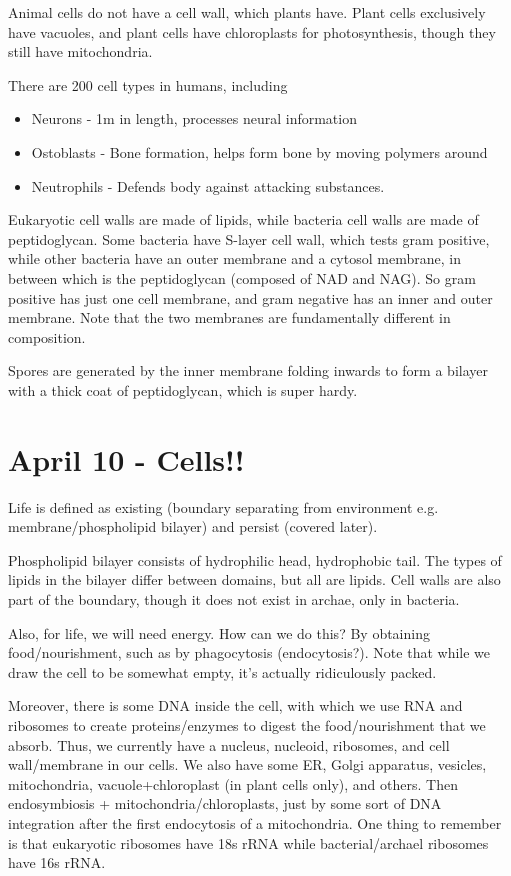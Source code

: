 \documentclass[12pt]{article}
\begin{document}
Animal cells do not have a cell wall, which plants have. Plant cells exclusively have vacuoles, and plant cells have chloroplasts for photosynthesis, though they still have mitochondria.

There are 200 cell types in humans, including

\begin{itemize}
	\item Neurons - 1m in length, processes neural information
	\item Ostoblasts - Bone formation, helps form bone by moving polymers around
	\item Neutrophils - Defends body against attacking substances.
\end{itemize}

Eukaryotic cell walls are made of lipids, while bacteria cell walls are made of peptidoglycan. Some bacteria have S-layer cell wall, which tests gram positive, while other bacteria have an outer membrane and a cytosol membrane, in between which is the peptidoglycan (composed of NAD and NAG). So gram positive has just one cell membrane, and gram negative has an inner and outer membrane. Note that the two membranes are fundamentally different in composition.

Spores are generated by the inner membrane folding inwards to form a bilayer with a thick coat of peptidoglycan, which is super hardy.

\section*{April 10 - Cells!!}

Life is defined as existing (boundary separating from environment e.g. membrane/phospholipid bilayer) and persist (covered later).

Phospholipid bilayer consists of hydrophilic head, hydrophobic tail. The types of lipids in the bilayer differ between domains, but all are lipids. Cell walls are also part of the boundary, though it does not exist in archae, only in bacteria.

Also, for life, we will need energy. How can we do this? By obtaining food/nourishment, such as by phagocytosis (endocytosis?). Note that while we draw the cell to be somewhat empty, it's actually ridiculously packed.

Moreover, there is some DNA inside the cell, with which we use RNA and ribosomes to create proteins/enzymes to digest the food/nourishment that we absorb. Thus, we currently have a nucleus, nucleoid, ribosomes, and cell wall/membrane in our cells. We also have some ER, Golgi apparatus, vesicles, mitochondria, vacuole+chloroplast (in plant cells only), and others. Then endosymbiosis + mitochondria/chloroplasts, just by some sort of DNA integration after the first endocytosis of a mitochondria. One thing to remember is that eukaryotic ribosomes have 18s rRNA while bacterial/archael ribosomes have 16s rRNA.
\end{document}
